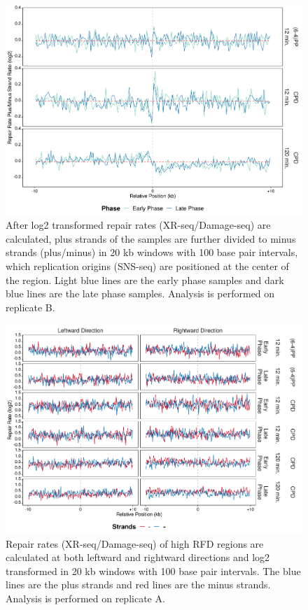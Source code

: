\begin{figure}[H]
\begin{center}
\includegraphics[width=\textwidth]{Chapters/7_appendix/figures/supfig61}
\caption[Repair rate plus/minus ratio of replication origins in 20 kb (replicate B).]{After log2 transformed repair rates (XR-seq/Damage-seq) are calculated, plus strands of the samples are further divided to minus strands (plus/minus) in 20 kb windows with 100 base pair intervals, which replication origins (SNS-seq) are positioned at the center of the region. Light blue lines are the early phase samples and dark blue lines are the late phase samples. Analysis is performed on replicate B.}
\label{supfig:rrpm20snsB}
\end{center}
\end{figure}

\begin{figure}[H]
\begin{center}
\includegraphics[width=\textwidth]{Chapters/7_appendix/figures/supfig62}
\caption[Repair rate of high RFDs in 20 kb (replicate A).]{Repair rates (XR-seq/Damage-seq) of high RFD regions are calculated at both leftward and rightward directions and log2 transformed in 20 kb windows with 100 base pair intervals. The blue lines are the plus strands and red lines are the minus strands. Analysis is performed on replicate A.}
\label{supfig:rr20rfdA}
\end{center}
\end{figure}

